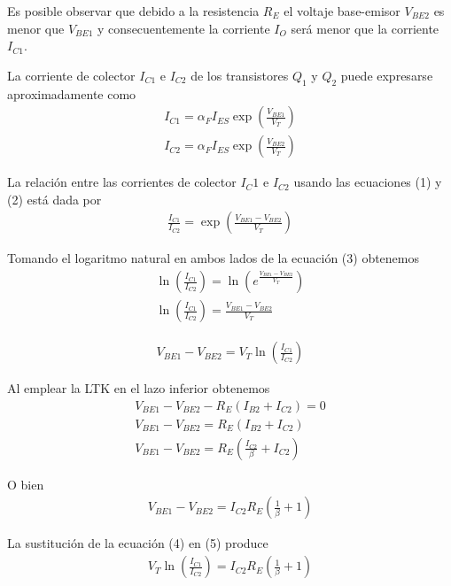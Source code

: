 \documentclass[12pt]{article}
\begin{document}
	\noindent Es posible observar que debido a la resistencia $R_E$ el voltaje base-emisor $V_{BE2}$ es menor que $V_{BE1}$ y consecuentemente la corriente $I_O$ será menor que la corriente $I_{C1}$.
	
	\noindent La corriente de colector $I_{C1}$ e $I_{C2}$ de los transistores $Q_1$ y $Q_2$ puede expresarse aproximadamente como
	\begin{align}
		I_{C1} = \alpha_F I_{ES}\exp \left( \frac{V_{BE1}}{V_T} \right) \\
		I_{C2} = \alpha_F I_{ES}\exp \left( \frac{V_{BE2}}{V_T} \right)
	\end{align}
	
	\noindent La relación entre las corrientes de colector $I_C1$ e $I_{C2}$ usando las ecuaciones (1) y (2) está dada por
	\begin{align}
		\frac{I_{C1}}{I_{C2}} = \exp \left( \frac{V_{BE1} - V_{BE2} }{V_T} \right)
	\end{align}
	
	\noindent Tomando el logaritmo natural en ambos lados de la ecuación (3) obtenemos
	\begin{align*}
		\ln \left( \frac{I_{C1}}{I_{C2}} \right) = \ln\left( e^{\frac{ V_{BE1} - V_{BE2} }{V_T}} \right)\\
		\ln \left( \frac{I_{C1}}{I_{C2}} \right) = \frac{V_{BE1} - V_{BE2}}{V_T}
	\end{align*}
	
	\begin{align}
		V_{BE1} - V_{BE2} = V_T \ln \left( \frac{I_{C1}}{I_{C2}} \right)
	\end{align}
	
	\noindent Al emplear la LTK en el lazo inferior obtenemos
	\begin{align*}
		V_{BE1} - V_{BE2} - R_E (I_{B2} + I_{C2}) = 0\\
		V_{BE1} - V_{BE2} = R_E (I_{B2} + I_{C2})\\
		V_{BE1} - V_{BE2} = R_E \left( \frac{I_{C2}}{\beta} + I_{C2} \right)
	\end{align*}
	
	\noindent O bien
	\begin{align}
		V_{BE1} - V_{BE2} = I_{C2}R_E\left( \frac{1}{\beta} + 1 \right) 	
	\end{align}
	
	\noindent La sustitución de la ecuación (4) en (5) produce
	\begin{align}
		V_T \ln \left( \frac{I_{C1}}{I_{C2}} \right) = I_{C2}R_E\left( \frac{1}{\beta} + 1 \right)
	\end{align}
	
\end{document}
